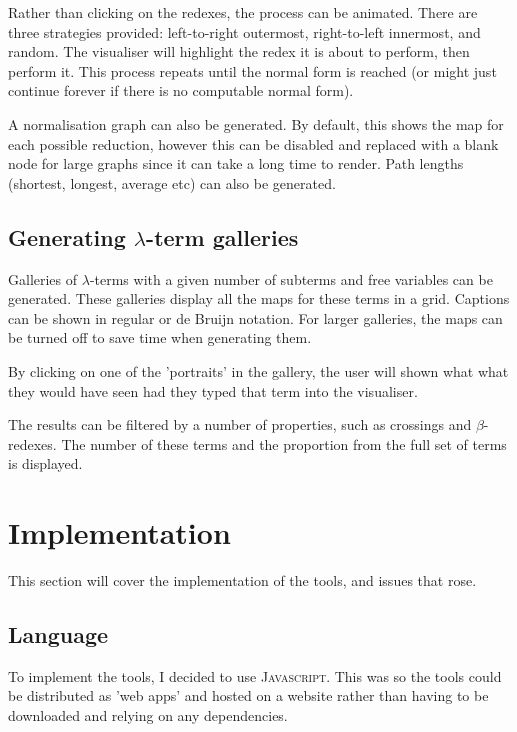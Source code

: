\documentclass[11pt]{article}
\begin{document}
Rather than clicking on the redexes, the process can be animated. There are three strategies provided: left-to-right outermost, right-to-left innermost, and random. The visualiser will highlight the redex it is about to perform, then perform it. This process repeats until the normal form is reached (or might just continue forever if there is no computable normal form).

A normalisation graph can also be generated. By default, this shows the map for each possible reduction, however this can be disabled and replaced with a blank node for large graphs since it can take a long time to render. Path lengths (shortest, longest, average etc) can also be generated.

\subsection{Generating \texorpdfstring{$\lambda$}{lambda}-term galleries}
Galleries of $\lambda$-terms with a given number of subterms and free variables can be generated. These galleries display all the maps for these terms in a grid. Captions can be shown in regular or de Bruijn notation. For larger galleries, the maps can be turned off to save time when generating them. 

By clicking on one of the 'portraits' in the gallery, the user will shown what what they would have seen had they typed that term into the visualiser.

The results can be filtered by a number of properties, such as crossings and $\beta$-redexes. The number of these terms and the proportion from the full set of terms is displayed.

\newpage

\section{Implementation}
\label{sec:implementation}

This section will cover the implementation of the tools, and issues that rose.

\subsection{Language}
To implement the tools, I decided to use \textsc{Javascript}. This was so the tools could be distributed as 'web apps' and hosted on a website rather than having to be downloaded and relying on any dependencies.
\end{document}
